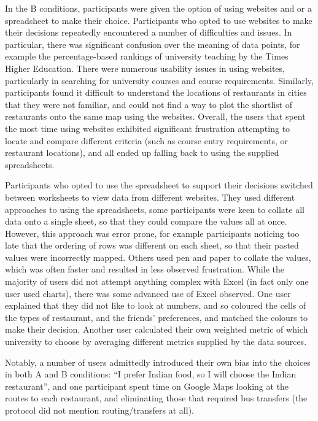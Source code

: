 \documentclass{sigchi}
\begin{document}
In the B conditions, participants were given the option of using websites and or a spreadsheet to make their choice.  Participants who opted to use websites to make their decisions repeatedly encountered a number of difficulties and issues. In particular, there was significant confusion over the meaning of data points, for example the percentage-based rankings of university teaching by the Times Higher Education. There were numerous usability issues in using websites, particularly in searching for university courses and course requirements. Similarly, participants found it difficult to understand the locations of restaurants in cities that they were not familiar, and could not find a way to plot the shortlist of restaurants onto the same map using the websites. Overall, the users that spent the most time using websites exhibited significant frustration attempting to locate and compare different criteria (such as course entry requirements, or restaurant locations), and all ended up falling back to using the supplied spreadsheets.

Participants who opted to use the spreadsheet to support their decisions switched between worksheets to view data from different websites.  They used different approaches to using the spreadsheets, some participants were keen to collate all data onto a single sheet, so that they could compare the values all at once. However, this approach was error prone, for example participants noticing too late that the ordering of rows was different on each sheet, so that their pasted values were incorrectly mapped. Others used pen and paper to collate the values, which was often faster and resulted in less observed frustration. While the majority of users did not
attempt anything complex with Excel (in fact only one user used charts), there was some advanced use of Excel observed.
One user explained that they did not like to look at numbers, and so coloured the cells of the types of restaurant, and the
friends' preferences, and matched the colours to make their decision. Another user calculated their own weighted metric
of which university to choose by averaging different metrics supplied by the data sources.

Notably, a number of users admittedly introduced their own bias into the choices in both A and B conditions: ``I prefer Indian food, so I will choose the Indian restaurant'', and one participant spent time on Google Maps looking at the routes to each restaurant, and eliminating those that required bus transfers (the protocol did not mention routing/transfers at all).
\end{document}
